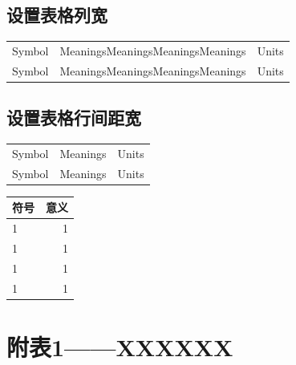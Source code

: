 \documentclass[normalsize]{article}   %
\begin{document}
		\subsection{设置表格列宽}
		
		
			\begin{table}[htbp!]
				\tabcolsep=0.1cm %
			\begin{tabular}{ccc}
				\hline
				\makebox[0.25\textwidth][c]{符号}	& \makebox[0.35\textwidth][c]{意义} & \makebox[0.2\textwidth][c]{单位}	 \\ \hline
				Symbol  & MeaningsMeaningsMeaningsMeanings & Units\\ \hline
				Symbol  & MeaningsMeaningsMeaningsMeanings & Units\\ \hline
			\end{tabular}
			\end{table}
		\subsection{设置表格行间距宽}
		
		\begin{table}[htbp!]
			\renewcommand\arraystretch{2} %
			\begin{tabular}{ccc}
				\hline
				\makebox[0.25\textwidth][c]{符号}	& \makebox[0.35\textwidth][c]{意义} & \makebox[0.2\textwidth][c]{单位}	 \\ \hline
				Symbol  & Meanings & Units\\ \hline
				Symbol  & Meanings & Units\\ \hline
			\end{tabular}
		\end{table}
	
	\begin{table}[]
		\begin{tabular}{@{}lr@{}}
			\toprule
			\multicolumn{1}{c}{\textbf{符号}} & \multicolumn{1}{c}{意义} \\ \midrule
			1                               & 1                      \\
			1                               & 1                      \\
			1                               & 1                      \\
			1                               & 1                      \\ \bottomrule
		\end{tabular}
	\end{table}
\newpage

\appendix 
	\renewcommand{\appendixname}{Appendix~\Alph{section}}
	\section{附表1——XXXXXX}
	
\newpage	
\begin{thebibliography}{9}%
\end{thebibliography}
\end{document}
